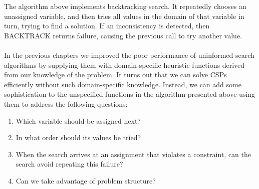 The algorithm above implements backtracking search. It repeatedly chooses an unassigned variable, and then tries all values in the domain of that variable in turn, trying to find a solution. If an inconsistency is detected, then BACKTRACK returns failure, causing the previous call to try another value.\\\\
In the previous chapters we improved the poor performance of uninformed search algorithms by supplying them with domain-specific heuristic functions derived from our knowledge of the problem. It turns out that we can solve CSPs efficiently without such domain-specific knowledge. Instead, we can add some sophistication to the unspecified functions in the algorithm presented above using them to address the following questions:
\begin{enumerate}
    \item Which variable should be assigned next?

    \item In what order should its values be tried?

    \item When the search arrives at an assignment that violates a constraint, can the search avoid repeating this failure?

    \item Can we take advantage of problem structure?
\end{enumerate}

